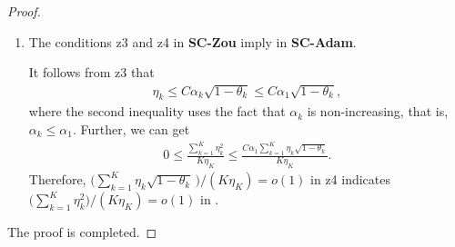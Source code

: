 \documentclass[twoside,11pt]{article}
\begin{document}
\begin{proof}
\begin{enumerate}
\begin{equation}
\begin{aligned}
		0
		\leq \frac{\sum_{k=1}^{K}\eta_k{\left( 1-\theta_k\right) }}{K\eta_{K}}
		\le\frac{\sum_{k=1}^{K}\eta_k\sqrt{1-\theta_k}}{K\eta_{K}}.
		\nonumber
	\end{aligned}
\end{equation}
Therefore, we can derive $\big(\sum_{k=1}^{K}\eta_k{\left( 1-\theta_k\right)}\big)/(K\eta_{K})=o(1)$ in  from the condition $\big(\sum_{k=1}^{K}\eta_k\sqrt{1-\theta_k}\big)/(K\eta_{K})=o(1)$ in \textcircled{\scriptsize {z4}}.
\item[$(3)$] The conditions \textcircled{\scriptsize {z3}} and \textcircled{\scriptsize {z4}} in \textbf{SC-Zou} imply  in \textbf{SC-Adam}.
\par It follows from \textcircled{\scriptsize {z3}} that
\begin{equation}\label{pro.11}
	\begin{aligned}
		\eta_k\le C \alpha_k \sqrt{1-\theta_k}
		\le C \alpha_1 \sqrt{1-\theta_k},\nonumber
	\end{aligned}
\end{equation}
where the second inequality uses the fact that $\alpha_{k}$ is non-increasing,  that is,  $\alpha_{k}\le\alpha_1$. Further, we can get
\begin{equation}\label{pro.12}
	\begin{aligned}
		0\leq 
		\frac{\sum_{k=1}^{K}\eta_k^2}{K\eta_{K}}\le\frac{C \alpha_1\sum_{k=1}^{K}\eta_k\sqrt{1-\theta_k}}{K\eta_{K}}.
		\nonumber
	\end{aligned}
\end{equation}
Therefore, $\big( \sum_{k=1}^{K}\eta_k\sqrt{1-\theta_k}\,
\big)/( K\eta_{K})=o(1)$ in \textcircled{\scriptsize {z4}} indicates $\big( \sum_{k=1}^{K}\eta_k^2\big)/( K\eta_{K}) =o(1)$ in .
\end{enumerate}
The proof is completed.
\end{proof}




\vskip 0.2in

\end{document}
